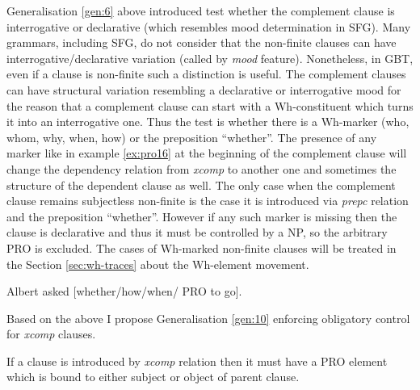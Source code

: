 Generalisation \ref{gen:6} above introduced test whether the complement clause is interrogative or declarative (which resembles mood determination in SFG). Many grammars, including SFG, do not consider that the non-finite clauses can have interrogative/declarative variation (called by \citet[107-167]{Halliday2004} \textit{mood} feature). Nonetheless, in GBT, even if a clause is non-finite such a distinction is useful. The complement clauses can have structural variation resembling a declarative or interrogative mood for the reason that a complement clause can start with a Wh-constituent which turns it into an interrogative one. Thus the test is whether there is a Wh-marker (who, whom, why, when, how) or the preposition ``whether''. The presence of any marker like in example \ref{ex:pro16} at the beginning of the complement clause will change the dependency relation from \textit{xcomp} to another one and sometimes the structure of the dependent clause as well. The only case when the complement clause remains subjectless non-finite is the case it is introduced via \textit{prepc} relation and the preposition ``whether''. However if any such marker is missing then the clause is declarative and thus it must be controlled by a NP, so the arbitrary PRO is excluded. The cases of Wh-marked non-finite clauses will be treated in the Section \ref{sec:wh-traces} about the Wh-element movement.

\begin{exe}
	\ex \label{ex:pro16}Albert asked [whether/how/when/ PRO to go].
\end{exe}

Based on the above I propose Generalisation \ref{gen:10} enforcing obligatory control for \textit{xcomp} clauses.


\begin{generalization}\label{gen:10}
	If a clause is introduced by \textit{xcomp} relation then it must have a PRO element which is bound to either subject or object of parent clause.
\end{generalization}

